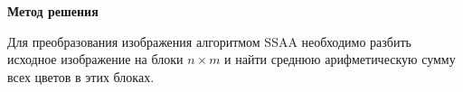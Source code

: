 \textbf{\large Метод решения}

Для преобразования изображения алгоритмом SSAA необходимо разбить исходное изображение на блоки $n \times m$ и найти среднюю арифметическую сумму всех цветов в этих блоках. 

